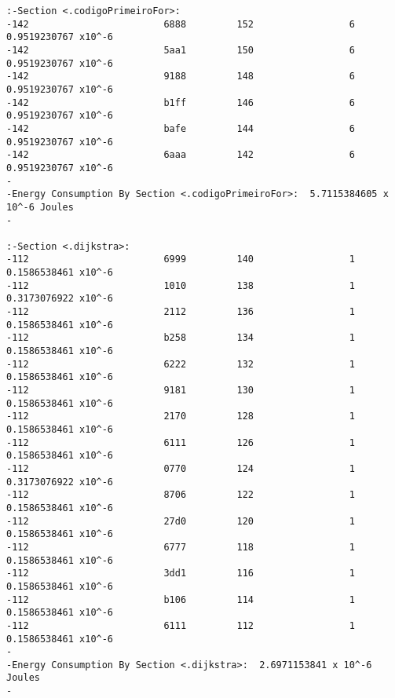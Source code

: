 \begin{verbatim}
:-Section <.codigoPrimeiroFor>:  
-142                        6888         152                 6              0.9519230767 x10^-6 
-142                        5aa1         150                 6              0.9519230767 x10^-6 
-142                        9188         148                 6              0.9519230767 x10^-6 
-142                        b1ff         146                 6              0.9519230767 x10^-6 
-142                        bafe         144                 6              0.9519230767 x10^-6 
-142                        6aaa         142                 6              0.9519230767 x10^-6 
-                                                                                          
-Energy Consumption By Section <.codigoPrimeiroFor>:  5.7115384605 x 10^-6 Joules
-                                                                                          

:-Section <.dijkstra>:  
-112                        6999         140                 1              0.1586538461 x10^-6 
-112                        1010         138                 1              0.3173076922 x10^-6 
-112                        2112         136                 1              0.1586538461 x10^-6 
-112                        b258         134                 1              0.1586538461 x10^-6 
-112                        6222         132                 1              0.1586538461 x10^-6 
-112                        9181         130                 1              0.1586538461 x10^-6 
-112                        2170         128                 1              0.1586538461 x10^-6 
-112                        6111         126                 1              0.1586538461 x10^-6 
-112                        0770         124                 1              0.3173076922 x10^-6 
-112                        8706         122                 1              0.1586538461 x10^-6 
-112                        27d0         120                 1              0.1586538461 x10^-6 
-112                        6777         118                 1              0.1586538461 x10^-6 
-112                        3dd1         116                 1              0.1586538461 x10^-6 
-112                        b106         114                 1              0.1586538461 x10^-6 
-112                        6111         112                 1              0.1586538461 x10^-6 
-                                                                                          
-Energy Consumption By Section <.dijkstra>:  2.6971153841 x 10^-6 Joules
-                                                                                          


\end{verbatim}
